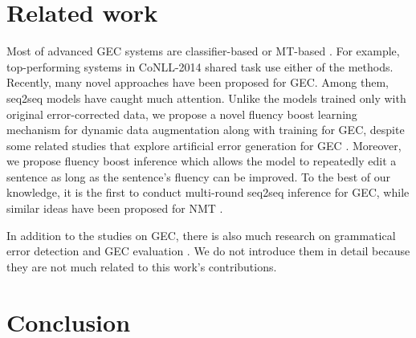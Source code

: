 \documentclass{article} \usepackage{MSRA_TR,times}
\begin{document}
\section{Related work}

Most of advanced GEC systems are classifier-based \citep{chodorow2007detection,de2008classifier,han2010using,leacock2010automated,tetreault2010using,dale2011helping}
or MT-based
\citep{brockett2006correcting,dahlmeier2011correcting,dahlmeier2012beam,yoshimoto2013naist,yuan2013constrained,behera2013automated}. For example, top-performing systems \citep{felice2014grammatical,rozovskaya2014illinois,junczys2014amu} in CoNLL-2014 shared task \citep{ng2014conll} use either of the methods. Recently, many novel approaches
\citep{Susanto2014System,chollampatt2016neural,chollampatt2016adapting,rozovskaya2016grammatical,junczys2016phrase,mizumoto2016discriminative,Yuan2016Candidate,Hoang2016Exploiting,yannakoudakis2017neural} have been proposed for GEC. Among them, seq2seq models \citep{yuan2016grammatical,xie2016neural,ji2017nested,sakaguchi2017grammatical,schmaltz-EtAl:2017:EMNLP2017,chollampatt2018,junczys2018approaching} have caught much attention. 
Unlike the models trained only with original error-corrected data, we propose a novel fluency boost learning mechanism for dynamic data augmentation along with training for GEC, despite some related studies that explore artificial error generation for GEC \citep{brockett2006correcting,foster2009generrate,rozovskaya2010training,rozovskaya2011algorithm,Rozovskaya2012The,felice-yuan:2014:SRW,xie2016neural,rei2017artificial,xie2018noising}. Moreover, we propose fluency boost inference which allows the model to repeatedly edit a sentence as long as the sentence's fluency can be improved. To the best of our knowledge, it is the first to conduct multi-round seq2seq inference for GEC, while similar ideas have been proposed for NMT \citep{DXiaTWLQYL17}.




In addition to the studies on GEC, there is also much research on grammatical error detection \citep{leacock2010automated,rei-yannakoudakis:2016:P16-1,kaneko2017grammatical} and GEC evaluation \citep{tetreault2010rethinking,madnani2011they,dahlmeier2012better,napoles2015ground,sakaguchi2016reassessing,napoles2016there,bryant2017automatic,asano2017reference,choshen2018inherent}. 
We do not introduce them in detail because they are not much related to this work's contributions.

\section{Conclusion}
\end{document}
